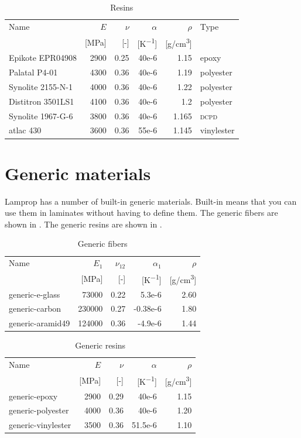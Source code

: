 \documentclass[a4paper,landscape,oneside,11pt,twocolumn]{memoir}
\begin{document}
\begin{table}[!htbp]
  \centering
  \caption{\label{tb:resins}Resins}
  \begin{tabular}{lrrrrl}%
      Name & $E$ & $\nu$ & $\alpha$ & $\rho$ & Type\\
      & [\si{MPa}] & [-] & [\si{K^{-1}}] & [\si{g/cm^3}]\\
    \midrule
      Epikote EPR04908 & 2900 & 0.25 & 40e-6 & 1.15 & epoxy\\
      Palatal P4-01 & 4300 & 0.36 & 40e-6 & 1.19 & polyester\\
      Synolite 2155-N-1 & 4000 & 0.36 & 40e-6 & 1.22 & polyester\\
      Distitron 3501LS1 & 4100 & 0.36 & 40e-6 & 1.2 & polyester\\
      Synolite 1967-G-6 & 3800 & 0.36 & 40e-6 & 1.165 & \textsc{dcpd}\\
      atlac 430 & 3600 & 0.36 & 55e-6 & 1.145 & vinylester\\
  \end{tabular}
\end{table}

\section{Generic materials}

Lamprop has a number of built-in generic materials.
Built-in means that you can use them in laminates without having to define
them.
The generic fibers are shown in .
The generic resins are shown in .

\begin{table}[!htbp]
  \centering
  \caption{\label{tb:generic-fibers}Generic fibers}
  \begin{tabular}{lrrrr}%
      Name & $E_1$ & $\nu_{12}$ & $\alpha_1$ & $\rho$\\
      & [\si{MPa}] & [-] & [\si{K^{-1}}] & [\si{g/cm^3}]\\
    \midrule
      generic-e-glass & 73000 & 0.22 & 5.3e-6 & 2.60\\
      generic-carbon & 230000 & 0.27 & -0.38e-6 & 1.80\\
      generic-aramid49 & 124000 & 0.36 & -4.9e-6 & 1.44\\
  \end{tabular}
\end{table}

\begin{table}[!htbp]
  \centering
  \caption{\label{tb:generic-resins}Generic resins}
  \begin{tabular}{lrrrr}%
      Name & $E$ & $\nu$ & $\alpha$ & $\rho$\\
      & [\si{MPa}] & [-] & [\si{K^{-1}}] & [\si{g/cm^3}]\\
    \midrule
      generic-epoxy & 2900 & 0.29 & 40e-6 & 1.15\\
      generic-polyester & 4000 & 0.36 & 40e-6 & 1.20\\
      generic-vinylester & 3500 & 0.36 & 51.5e-6 & 1.10\\
  \end{tabular}
\end{table}
\end{document}
